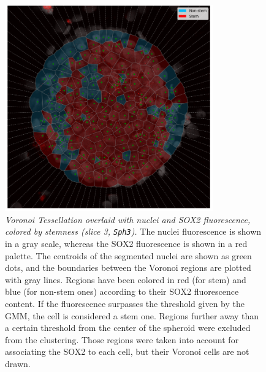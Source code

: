 \begin{figure}[h!]
    \centering
    \includegraphics[width=0.8\textwidth]{images/sph3_slice3/nuclei_voronoi_in_sph_only_sox2_clustered_tails_cut_in_sph_with_artificial_boundary_cropped.png}
    \caption{\emph{Voronoi Tessellation overlaid with nuclei and SOX2 fluorescence, colored by stemness (slice 3, \lstinline{Sph3}).} The nuclei fluorescence is shown in a gray scale, whereas the SOX2 fluorescence is shown in a red palette. The centroids of the segmented nuclei are shown as green dots, and the boundaries between the Voronoi regions are plotted with gray lines. Regions have been colored in red (for stem) and blue (for non-stem ones) according to their SOX2 fluorescence content. If the fluorescence surpasses the threshold given by the GMM, the cell is considered a stem one. Regions further away than a certain threshold from the center of the spheroid were excluded from the clustering. Those regions were taken into account for associating the SOX2 to each cell, but their Voronoi cells are not drawn.}
    \label{fig: nuclei voronoi sox2 clustered sph3 slice 3}
\end{figure}





